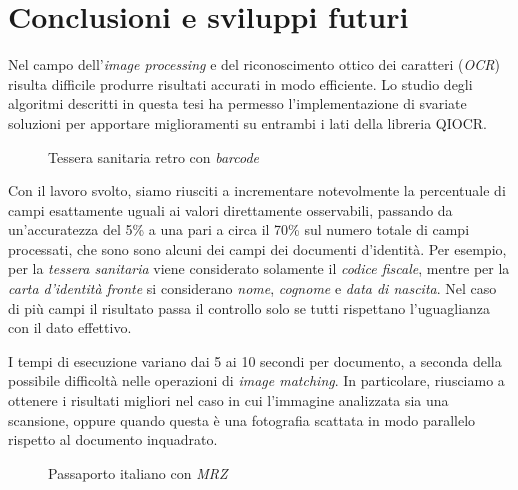 \chapter*{Conclusioni e sviluppi futuri}

Nel campo dell'\textit{image processing} e del riconoscimento ottico dei caratteri (\textit{OCR}) risulta difficile produrre risultati accurati in modo efficiente. Lo studio degli algoritmi descritti in questa tesi ha permesso l'implementazione di svariate soluzioni per apportare miglioramenti su entrambi i lati della libreria QIOCR.\par
\begin{figure}
	\centering
	\caption{Tessera sanitaria retro con \textit{barcode}} \label{fig:ts-r-example}
\end{figure}
Con il lavoro svolto, siamo riusciti a incrementare notevolmente la percentuale di campi esattamente uguali ai valori direttamente osservabili, passando da un'accuratezza del 5\% a una pari a circa il 70\% sul numero totale di campi processati, che sono sono alcuni dei campi dei documenti d'identit\`a. 
Per esempio, per la \textit{tessera sanitaria} viene considerato solamente il \textit{codice fiscale}, mentre per la \textit{carta d'identit\`a fronte} si considerano \textit{nome}, \textit{cognome} e \textit{data di nascita}. Nel caso di pi\`u campi il risultato passa il controllo solo se tutti rispettano l'uguaglianza con il dato effettivo.\par 
I tempi di esecuzione variano dai 5 ai 10 secondi per documento, a seconda della possibile difficolt\`a nelle operazioni di \textit{image matching}. In particolare, riusciamo a ottenere i risultati migliori nel caso in cui l'immagine analizzata sia una scansione, oppure quando questa \`e una fotografia scattata in modo parallelo rispetto al documento inquadrato.\par
\begin{figure}
	\centering
	\caption{Passaporto italiano con \textit{MRZ}\protect\footnotemark} \label{fig:passport}
\end{figure}
